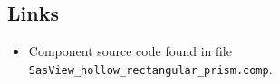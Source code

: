 \subsection*{Links}
\begin{itemize}
  \item Component source code found in file \texttt{SasView\_hollow\_rectangular\_prism.comp}.
\end{itemize}
